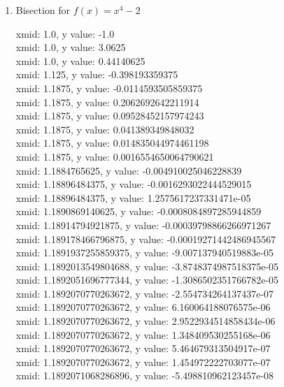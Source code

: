 \documentclass[12pt]{article}
\begin{document}
\begin{enumerate}
\item Bisection for $f(x)=x^4-2$

\begin{footnotesize}
\begin{spacing}{-.8}
xmid: 1.0, y value: -1.0\\
xmid: 1.0, y value: 3.0625\\
xmid: 1.0, y value: 0.44140625\\
xmid: 1.125, y value: -0.398193359375\\
xmid: 1.1875, y value: -0.0114593505859375\\
xmid: 1.1875, y value: 0.2062692642211914\\
xmid: 1.1875, y value: 0.09528452157974243\\
xmid: 1.1875, y value: 0.041389349848032\\
xmid: 1.1875, y value: 0.014835044974461198\\
xmid: 1.1875, y value: 0.0016554650064790621\\
xmid: 1.1884765625, y value: -0.004910025046228839\\
xmid: 1.18896484375, y value: -0.0016293022444529015\\
xmid: 1.18896484375, y value: 1.2575617237331471e-05\\
xmid: 1.1890869140625, y value: -0.0008084897285944859\\
xmid: 1.18914794921875, y value: -0.00039798866266971267\\
xmid: 1.189178466796875, y value: -0.00019271442486945567\\
xmid: 1.1891937255859375, y value: -9.007137940519883e-05\\
xmid: 1.1892013549804688, y value: -3.8748374987518375e-05\\
xmid: 1.1892051696777344, y value: -1.3086502351766782e-05\\
xmid: 1.1892070770263672, y value: -2.554734264137437e-07\\
xmid: 1.1892070770263672, y value: 6.160064188076575e-06\\
xmid: 1.1892070770263672, y value: 2.9522934514858434e-06\\
xmid: 1.1892070770263672, y value: 1.348409530255168e-06\\
xmid: 1.1892070770263672, y value: 5.464679313504917e-07\\
xmid: 1.1892070770263672, y value: 1.454972222703077e-07\\
xmid: 1.1892071068286896, y value: -5.498810962123457e-08\\

\end{spacing}
\end{footnotesize}
\end{enumerate}
\end{document}
